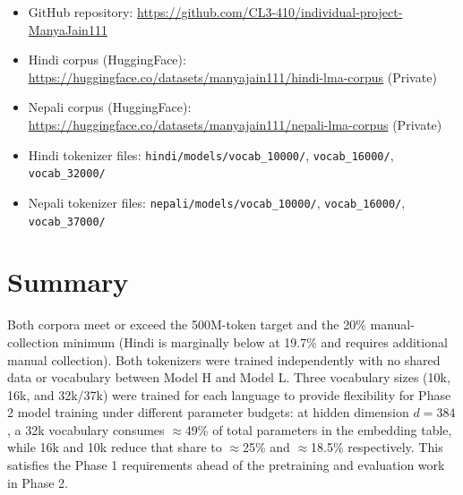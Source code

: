 \documentclass[11pt]{article}
\begin{document}
\begin{itemize}[nosep]
    \item GitHub repository: \url{https://github.com/CL3-410/individual-project-ManyaJain111}
    \item Hindi corpus (HuggingFace): \url{https://huggingface.co/datasets/manyajain111/hindi-lma-corpus} (Private)
    \item Nepali corpus (HuggingFace): \url{https://huggingface.co/datasets/manyajain111/nepali-lma-corpus} (Private)
    \item Hindi tokenizer files: \texttt{hindi/models/vocab\_10000/}, \texttt{vocab\_16000/}, \texttt{vocab\_32000/}
    \item Nepali tokenizer files: \texttt{nepali/models/vocab\_10000/}, \texttt{vocab\_16000/}, \texttt{vocab\_37000/}
\end{itemize}

\section{Summary}

Both corpora meet or exceed the 500M-token target and the 20\% manual-collection minimum (Hindi is marginally below at 19.7\% and requires additional manual collection). Both tokenizers were trained independently with no shared data or vocabulary between Model H and Model L. Three vocabulary sizes (10k, 16k, and 32k/37k) were trained for each language to provide flexibility for Phase 2 model training under different parameter budgets: at hidden dimension $d=384$, a 32k vocabulary consumes $\approx$49\% of total parameters in the embedding table, while 16k and 10k reduce that share to $\approx$25\% and $\approx$18.5\% respectively. This satisfies the Phase 1 requirements ahead of the pretraining and evaluation work in Phase 2.
\end{document}
